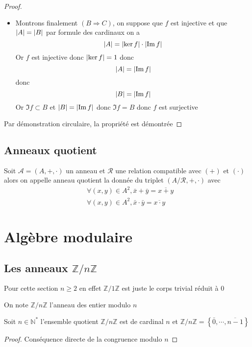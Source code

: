 \documentclass[11pt,colorlinks]{book}
\theoremstyle{mytheoremstyle}
\theoremstyle{mytheoremstyle}
\theoremstyle{mytheoremstyle}
\theoremstyle{mytheoremstyle}
\theoremstyle{mytheoremstyle}
\theoremstyle{mytheoremstyle}
\theoremstyle{mytheoremstyle}
\theoremstyle{mytheoremstyle}
\theoremstyle{myproblemstyle}
\def\mbb#1{\mathbb{#1}}
\def\mfc#1{\mathcal{#1}}
\def\bN{\mbb{N}}
\def\bZ{\mbb{Z}}
\def\mR{\mfc{R}}
\begin{document}
\begin{theorem}
\begin{proof}
\begin{itemize}
      \item Montrons finalement $(B \Rightarrow C)$, on suppose que $f$ est injective et que $\abs{A} = \abs{B}$
      par formule des cardinaux on a 
      \begin{equation*}
        \abs{A} = \abs{\ker f} \cdot \abs{\Im f}
      \end{equation*}
      Or $f$ est injective donc $\abs{\ker f} = 1$ donc 
      \begin{equation*}
        \abs{A} = \abs{\Im f}
      \end{equation*}
      donc 
      \begin{equation*}
        \abs{B} = \abs{\Im f}
      \end{equation*}
      Or $\Im f \subset B$ et $\abs{B} = \abs{\Im f}$ donc $\Im f = B$ donc $f$ est surjective
    \end{itemize}
    Par démonstration circulaire, la propriété est démontrée
  \end{proof}
\end{theorem}
\subsection{Anneaux quotient}
\begin{definition}
  Soit $\mathcal A = (A,+,\cdot)$ un anneau et $\mR$ une relation compatible avec $(+)$ et $(\cdot)$ alors 
  on appelle anneau quotient la donnée du triplet $(A/\mR, +, \cdot)$ avec 
  \begin{align*}
    &\forall (x,y) \in A^2, \bar{x} + \bar{y} = \overline{x+y} \\ 
    &\forall (x,y) \in A^2, \bar{x} \cdot \bar{y} = \overline{x \cdot y}
  \end{align*}
\end{definition}
\section{Algèbre modulaire}
\subsection{Les anneaux $\bZ/n\bZ$}
Pour cette section $n \geq 2$ en effet $\bZ/1\bZ$ est juste le corps trivial réduit à $0$
\begin{definition}
  On note $\bZ/n\bZ$ l'anneau des entier modulo $n$ 
\end{definition}
\begin{prop}
  Soit $n \in \bN^*$ l'ensemble quotient $\bZ/n\bZ$ est de cardinal $n$ et $\bZ/n\bZ = \left\{\bar{0},\cdots,\overline{n-1}\right\}$
  \begin{proof}
    Conséquence directe de la congruence modulo $n$
  \end{proof}
\end{prop}
\end{document}
